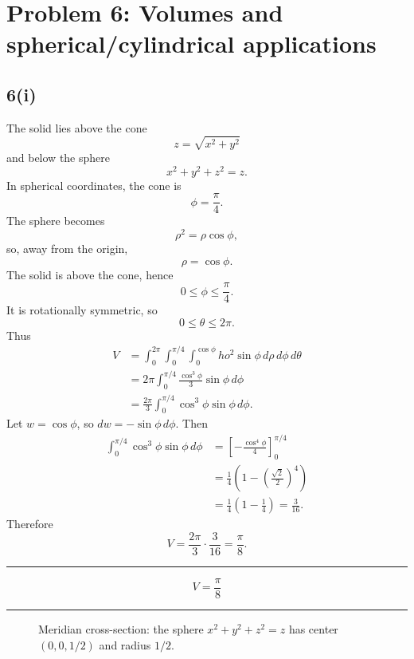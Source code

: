 \documentclass[11pt,a4paper]{article}
\newenvironment{resultbox}{\par\medskip\noindent\begin{minipage}{\linewidth}\hrule\smallskip}{\smallskip\hrule\end{minipage}\par\medskip}
\newcommand{\ans}[1]{\begin{resultbox}\[\boxed{#1}\]\end{resultbox}}
\begin{document}
\section{Problem 6: Volumes and spherical/cylindrical applications}

\subsection*{6(i)}
The solid lies above the cone
\[
z=\sqrt{x^2+y^2}
\]
and below the sphere
\[
x^2+y^2+z^2=z.
\]
In spherical coordinates, the cone is
\[
\phi=\frac\pi4.
\]
The sphere becomes
\[
\rho^2=\rho\cos\phi,
\]
so, away from the origin,
\[
\rho=\cos\phi.
\]
The solid is above the cone, hence
\[
0\le\phi\le\frac\pi4.
\]
It is rotationally symmetric, so
\[
0\le\theta\le2\pi.
\]
Thus
\begin{align*}
V&=\int_0^{2\pi}\int_0^{\pi/4}\int_0^{\cos\phi}
ho^2\sin\phi\,d\rho\,d\phi\,d\theta\\
&=2\pi\int_0^{\pi/4}\frac{\cos^3\phi}{3}\sin\phi\,d\phi\\
&=\frac{2\pi}{3}\int_0^{\pi/4}\cos^3\phi\sin\phi\,d\phi.
\end{align*}
Let \(w=\cos\phi\), so \(dw=-\sin\phi\,d\phi\). Then
\begin{align*}
\int_0^{\pi/4}\cos^3\phi\sin\phi\,d\phi
&=\left[-\frac{\cos^4\phi}{4}\right]_0^{\pi/4}\\
&=\frac{1}{4}\left(1-\left(\frac{\sqrt2}{2}\right)^4\right)\\
&=\frac14\left(1-\frac14\right)=\frac{3}{16}.
\end{align*}
Therefore
\[
V=\frac{2\pi}{3}\cdot\frac{3}{16}=\frac\pi8.
\]
\ans{V=\frac\pi8}

\begin{figure}[H]
\centering
{}
\caption{Meridian cross-section: the sphere \(x^2+y^2+z^2=z\) has center \((0,0,1/2)\) and radius \(1/2\).}
\end{figure}
\end{document}
